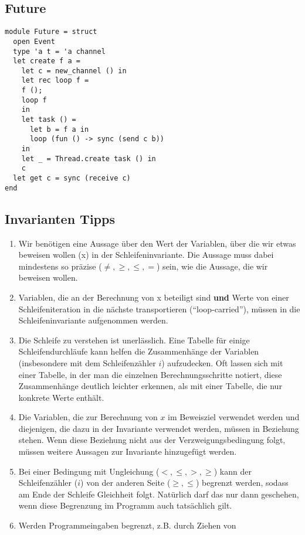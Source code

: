 \documentclass[a4paper,8pt,landscape]{extarticle}
\begin{document}
\begin{multicols*}{3}
    \subsection{Future}
    \begin{verbatim}
module Future = struct
  open Event
  type 'a t = 'a channel
  let create f a =
    let c = new_channel () in
    let rec loop f = 
	f (); 
	loop f 
    in
    let task () =
      let b = f a in
      loop (fun () -> sync (send c b))
    in
    let _ = Thread.create task () in
    c
  let get c = sync (receive c)
end
    \end{verbatim}
    
    \subsection{Invarianten Tipps}
    \begin{enumerate}
     \item Wir benötigen eine Aussage über den Wert der Variablen, über die
wir etwas beweisen wollen (x) in der Schleifeninvariante. Die
Aussage muss dabei mindestens so präzise ($\neq, \geq, \leq, =$) sein, wie
die Aussage, die wir beweisen wollen.
      \item Variablen, die an der Berechnung von x beteiligt sind \textbf{und} Werte
von einer Schleifeniteration in die nächste transportieren
(“loop-carried”), müssen in die Schleifeninvariante aufgenommen
werden.
      \item Die Schleife zu verstehen ist unerlässlich. Eine Tabelle für einige
Schleifendurchläufe kann helfen die Zusammenhänge der Variablen
(insbesondere mit dem Schleifenzähler $i$) aufzudecken. Oft lassen
sich mit einer Tabelle, in der man die einzelnen
Berechnungsschritte notiert, diese Zusammenhänge deutlich
leichter erkennen, als mit einer Tabelle, die nur konkrete Werte
enthält.
      \item Die Variablen, die zur Berechnung von $x$ im Beweisziel verwendet
werden und diejenigen, die dazu in der Invariante verwendet
werden, müssen in Beziehung stehen. Wenn diese Beziehung nicht
aus der Verzweigungsbedingung folgt, müssen weitere Aussagen
zur Invariante hinzugefügt werden.
      \item Bei einer Bedingung mit Ungleichung ($<, \leq, >, \geq$) kann der
Schleifenzähler ($i$) von der anderen Seite ($\geq, \leq$) begrenzt werden,
sodass am Ende der Schleife Gleichheit folgt. Natürlich darf das
nur dann geschehen, wenn diese Begrenzung im Programm auch
tatsächlich gilt.
      \item Werden Programmeingaben begrenzt, z.B. durch Ziehen von

\end{enumerate}
\end{multicols*}
\end{document}
